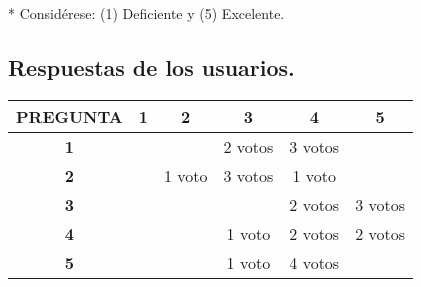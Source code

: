 \documentclass[a4paper,12pt]{article}
\begin{document}
* Considérese: (1) Deficiente y (5) Excelente. 

\subsection{Respuestas de los usuarios.}
\begin{table}[h]
	\centering
	\begin{tabular}{|c|c|c|c|c|c|}
		\hline
		PREGUNTA   & \textbf{1} & \textbf{2} & \textbf{3} & \textbf{4} & 5 \\ \hline
		\textbf{1} &            &            & 2 votos           & 3 votos         &   \\ \hline
		\textbf{2} &            &     1 voto       &  3 votos          &   1 voto         &   \\ \hline
		\textbf{3} &            &            &            &    2 votos        & 3 votos \\ \hline
		\textbf{4} &            &            & 1 voto        &  2 votos           &  2 votos \\ \hline
		\textbf{5} &            &            &   1 voto        &      4 votos     &   \\ \hline
	\end{tabular}
\end{table}



%
%
\end{document}
